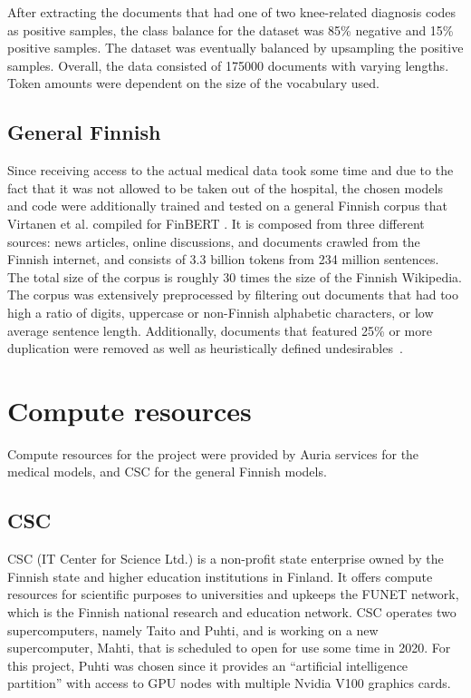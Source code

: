 After extracting the documents that had one of two knee-related diagnosis codes as positive samples, the class balance for the dataset was 85\% negative and 15\% positive samples.
The dataset was eventually balanced by upsampling the positive samples.
Overall, the data consisted of 175000 documents with varying lengths.
Token amounts were dependent on the size of the vocabulary used.

\subsection{General Finnish}\label{General Finnish}
Since receiving access to the actual medical data took some time and due to the fact that it was not allowed to be taken out of the hospital, the chosen models and code were additionally trained and tested on a general Finnish corpus that Virtanen et al. compiled for FinBERT \cite{virtanen2019}.
It is composed from three different sources: news articles, online discussions, and documents crawled from the Finnish internet, and consists of 3.3 billion tokens from 234 million sentences.
The total size of the corpus is roughly 30 times the size of the Finnish Wikipedia.
The corpus was extensively preprocessed by filtering out documents that had too high a ratio of digits, uppercase or non-Finnish alphabetic characters, or low average sentence length.
Additionally, documents that featured 25\% or more duplication were removed as well as heuristically defined undesirables~\cite{virtanen2019}.


\section{Compute resources} \label{Compute resources}
Compute resources for the project were provided by Auria services for the medical models, and CSC for the general Finnish models.

\subsection{CSC} \label{CSC}
CSC (IT Center for Science Ltd.) is a non-profit state enterprise owned by the Finnish state and higher education institutions in Finland.
It offers compute resources for scientific purposes to universities and upkeeps the FUNET network, which is the Finnish national research and education network.
CSC operates two supercomputers, namely Taito and Puhti, and is working on a new supercomputer, Mahti, that is scheduled to open for use some time in 2020.
For this project, Puhti was chosen since it provides an ``artificial intelligence partition'' with access to GPU nodes with multiple Nvidia V100 graphics cards.


